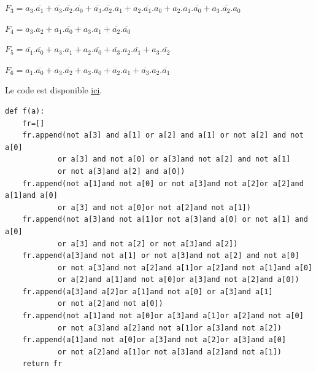 $F_3=a_3.\overline{a_1}+\overline{a_3}.\overline{a_2}.\overline{a_0}+\overline{a_3}.\overline{a_2}.a_1+a_2.\overline{a_1}.a_0+a_2.a_1.\overline{a_0}+a_3.\overline{a_2}.a_0$

$F_4=a_3.a_2+a_1.\overline{a_0}+a_3.a_1+\overline{a_2}.\overline{a_0}$

$F_5=\overline{a_1}.\overline{a_0}+a_3.a_1+a_2.\overline{a_0}+\overline{a_3}.a_2.\overline{a_1}+a_3.\overline{a_2}$

$F_6=a_1.\overline{a_0}+a_3.\overline{a_2}+a_3.a_0+\overline{a_2}.a_1+\overline{a_3}.a_2.\overline{a_1}$


Le code est disponible \href{https://github.com/Costadoat/S10/raw/master/TP01\%20Fonctions\%20combinatoires/Code/Calculatrice.py}{ici}.

\begin{verbatim}
def f(a):
    fr=[]
    fr.append(not a[3] and a[1] or a[2] and a[1] or not a[2] and not a[0]
    		or a[3] and not a[0] or a[3]and not a[2] and not a[1]
    		or not a[3]and a[2] and a[0])
    fr.append(not a[1]and not a[0] or not a[3]and not a[2]or a[2]and a[1]and a[0]
    		or a[3] and not a[0]or not a[2]and not a[1])
    fr.append(not a[3]and not a[1]or not a[3]and a[0] or not a[1] and a[0]
    		or a[3] and not a[2] or not a[3]and a[2])
    fr.append(a[3]and not a[1] or not a[3]and not a[2] and not a[0]
    		or not a[3]and not a[2]and a[1]or a[2]and not a[1]and a[0]
    		or a[2]and a[1]and not a[0]or a[3]and not a[2]and a[0])
    fr.append(a[3]and a[2]or a[1]and not a[0] or a[3]and a[1]
    		or not a[2]and not a[0])
    fr.append(not a[1]and not a[0]or a[3]and a[1]or a[2]and not a[0]
    		or not a[3]and a[2]and not a[1]or a[3]and not a[2])
    fr.append(a[1]and not a[0]or a[3]and not a[2]or a[3]and a[0]
    		or not a[2]and a[1]or not a[3]and a[2]and not a[1])
    return fr
\end{verbatim}
    

